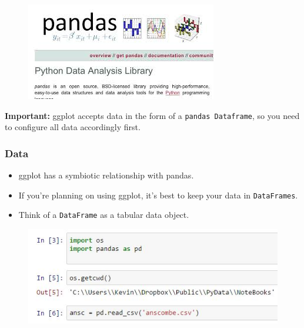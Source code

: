 \documentclass{beamer}
\begin{document}
\begin{frame}
	\Large
	\begin{figure}
\centering
\includegraphics[width=0.7\linewidth]{pandas}
\end{figure}

	\textbf{Important:} ggplot accepts data in the form of a \texttt{pandas Dataframe}, so you need to configure all data accordingly first.
\end{frame}
\begin{frame}[fragile]
	\frametitle{Data}
	\Large
	\vspace{-1.4cm}
	\begin{itemize}
		\item ggplot has a symbiotic relationship with pandas. 
		\item If you're planning on using ggplot, it's best to keep your data in \texttt{DataFrames}. 
		\item Think of a \texttt{DataFrame} as a tabular data object. 
	\end{itemize}
\end{frame}
\begin{frame}
	\begin{figure}
\centering
\includegraphics[width=1.1\linewidth]{anscombe1}

\end{figure}

\end{frame}
\end{document}

